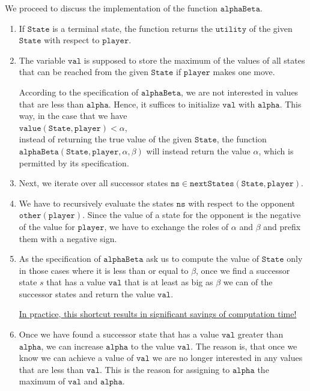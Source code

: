 \noindent
We proceed to discuss the implementation of the function $\texttt{alphaBeta}$.
\begin{enumerate}
\item If $\texttt{State}$ is a terminal state, the function returns the $\texttt{utility}$ of the given
      $\texttt{State}$ with respect to $\texttt{player}$.
\item The variable $\texttt{val}$ is supposed to store the maximum of the values of all states
      that can be reached from the given $\texttt{State}$ if $\texttt{player}$ makes one move.
      
      According to the specification of $\texttt{alphaBeta}$,  we are not interested in values that are less than
      $\texttt{alpha}$.  Hence, it suffices to initialize $\texttt{val}$ with $\texttt{alpha}$.   This way, in the case that we have
      \\[0.2cm]
      \hspace*{1.3cm}
      $\texttt{value}(\texttt{State},\texttt{player}) < \alpha$,
      \\[0.2cm]
      instead of returning the true value of the given $\texttt{State}$, the function
      $\texttt{alphaBeta}(\texttt{State},\texttt{player},\alpha,\beta)$ will instead return the value $\alpha$, which is permitted by its specification.
\item Next, we iterate over all successor states $\texttt{ns} \in \texttt{nextStates}(\texttt{State}, \texttt{player})$.
\item We have to recursively evaluate the states $\texttt{ns}$ with respect to the opponent  $\texttt{other}(\texttt{player})$.
      Since the value of a state for the opponent is the negative of the value for
      $\texttt{player}$, we have to exchange the roles of $\alpha$ and $\beta$ and prefix them with a negative
      sign.
\item As the specification of $\texttt{alphaBeta}$ ask us to compute the value of $\texttt{State}$ only in
      those cases where it is less than or equal to $\beta$, once we find a successor state $s$ that has a
      value $\texttt{val}$ that is at least as big as $\beta$ we can  of the successor
      states and return the value $\texttt{val}$.

      \underline{In }p\underline{ractice},\underline{ this shortcut results in si}g\underline{nificant savin}g\underline{s of com}p\underline{utation time!}
\item Once we have found a successor state that has a value $\texttt{val}$ greater than $\texttt{alpha}$,
      we can increase $\texttt{alpha}$ to the value $\texttt{val}$.  The reason is, that once we know we can
      achieve a value of $\texttt{val}$ we are no longer interested in any values that are less than $\texttt{val}$.
      This is the reason for assigning to $\texttt{alpha}$ the maximum of $\texttt{val}$ and $\texttt{alpha}$.
\end{enumerate}


